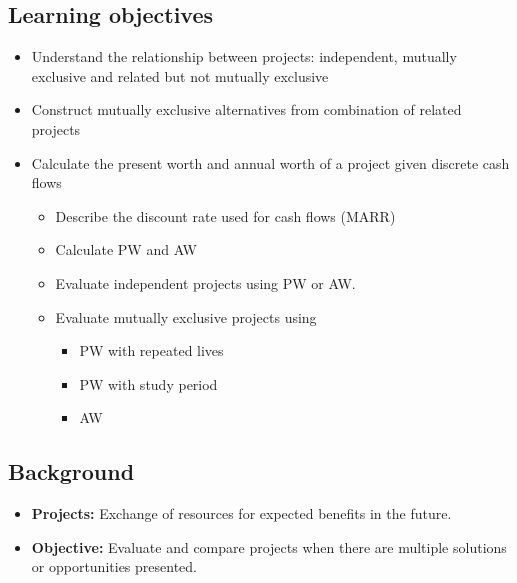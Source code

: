 \subsection{Learning objectives}
\begin{definition}
    \begin{itemize}
        \item Understand the relationship between projects: independent, mutually exclusive and related but not mutually exclusive
        \item Construct mutually exclusive alternatives from combination of related projects
        \item Calculate the present worth and annual worth of a project given discrete cash flows
        \begin{itemize}
            \item Describe the discount rate used for cash flows (MARR)
            \item Calculate PW and AW
            \item Evaluate independent projects using PW or AW.
            \item Evaluate mutually exclusive projects using 
            \begin{itemize}
                \item PW with repeated lives
                \item PW with study period
                \item AW
            \end{itemize}
        \end{itemize}
    \end{itemize}
\end{definition}

\subsection{Background}
\begin{intuition}
    \begin{itemize}
        \item \textbf{Projects:} Exchange of resources for expected benefits in the future. 
        \item \textbf{Objective:} Evaluate and compare projects when there are multiple solutions or opportunities presented. 
    \end{itemize}
\end{intuition}

